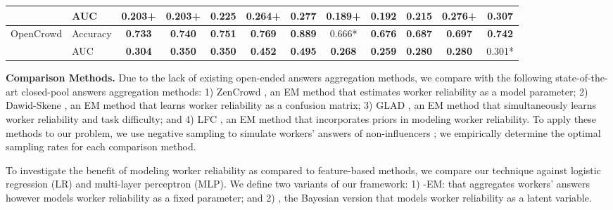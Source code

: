 \begin{table}[t]
\begin{tabular}{ll|ccccc|ccccc}
                             & AUC   & 0.203+         & 0.203+         & 0.225          & 0.264+         & 0.277          & 0.189+         & 0.192          & 0.215          & 0.276+         & \textbf{0.307}         \\ \hline
\multirow{2}{*}{OpenCrowd}   & Accuracy     & \textbf{0.733} & \textbf{0.740} & \textbf{0.751}         & \textbf{0.769} & \textbf{0.889}  & 0.666* & \textbf{0.676} &\textbf{0.687}         & \textbf{0.697}         & \textbf{0.742} \\ %
                             & AUC   & \textbf{0.304} & \textbf{0.350} & \textbf{0.350} & \textbf{0.452} & \textbf{0.495} & \textbf{0.268} & \textbf{0.259} & \textbf{0.280} & \textbf{0.280}  &  0.301*\\ \bottomrule
\end{tabular}
 \label{sec:compres}  
\end{table}

\smallskip
\noindent\textbf{Comparison Methods.} Due to the lack of existing open-ended answers aggregation methods, we compare with the following state-of-the-art closed-pool answers aggregation methods: 1) ZenCrowd \cite{demartini2012zencrowd}, an EM method that estimates worker reliability as a model parameter; 2) Dawid-Skene \cite{dawid1979maximum}, an EM method that learns worker reliability as a confusion matrix; 3) GLAD \cite{whitehill2009whose}, an EM method that simultaneously learns worker reliability and task difficulty; and 4) LFC \cite{raykar2010learning}, an EM method 
that incorporates priors in modeling worker reliability. To apply these methods to our problem, we use negative sampling to simulate  workers' answers of non-influencers ; we empirically determine the optimal sampling rates for each comparison method. 

To investigate the benefit of modeling worker reliability as compared to feature-based methods, we compare our technique against logistic regression (LR) and multi-layer perceptron (MLP). We define two variants of our framework: 1) \sys-EM: \sys that aggregates workers' answers however models worker reliability as a fixed parameter; and 2) \sys, the Bayesian version that models worker reliability as a latent variable.




